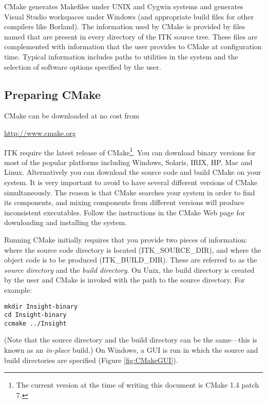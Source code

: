 CMake generates Makefiles under UNIX and Cygwin systems and generates Visual
Studio workspaces under Windows (and appropriate build files for other
compilers like Borland). The information used by CMake is provided by files
named  that are present in every directory of the ITK
source tree. These files are complemented with information that the user
provides to CMake at configuration time. Typical information includes paths
to utilities in the system and the selection of software options specified by
the user.

\subsection{Preparing CMake}
\label{sec:CMakeforITK}
 

CMake can be downloaded at no cost from 
\begin{center} 
  \url{http://www.cmake.org}
\end{center}

ITK require the latest release of CMake\footnote{The current version at the
time of writing this document is CMake 1.4 patch 7.}. You can download binary
versions for most of the popular platforms including Windows, Solaris, IRIX,
HP, Mac and Linux. Alternatively you can download the source code and build
CMake on your system. It is very important to avoid to have several different
versions of CMake simultaneously. The reason is that CMake searches your
system in order to find its components, and mixing components from different
versions will produce inconsistent executables. Follow the instructions in the
CMake Web page for downloading and installing the system.

Running CMake initially requires that you provide two pieces of information:
where the source code directory is located (ITK_SOURCE_DIR), and where the
object code is to be produced (ITK_BUILD_DIR). These are referred to as the
\emph{source directory} and the \emph{build directory}. On Unix, the build
directory is created by the user and CMake is invoked with the path to the
source directory. For example:

\begin{verbatim}
mkdir Insight-binary
cd Insight-binary
ccmake ../Insight
\end{verbatim}

(Note that the source directory and the build directory can be the
same---this is known as an \emph{in-place} build.) On Windows, a GUI is run
in which the source and build directories are specified (Figure
\ref{fig:CMakeGUI}).

